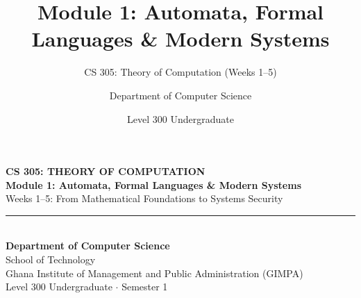 \documentclass[aspectratio=169, 10pt]{beamer}
\title{Module 1: Automata, Formal Languages \& Modern Systems}
\subtitle{CS 305: Theory of Computation (Weeks 1--5)}
\author{Department of Computer Science}
\institute{Ghana Institute of Management and Public Administration (GIMPA)}
\date{Level 300 Undergraduate}
\begin{document}
\begin{frame}[plain]
  \vspace{1.0cm}
  \begin{center}
    {\large\bfseries\color{gimpaaccent} CS 305: THEORY OF COMPUTATION}\\[0.25cm]
    {\Large\bfseries\color{gimpanavy} Module 1: Automata, Formal Languages \& Modern Systems}\\[0.15cm]
    {\normalsize\color{gimpaslate} Weeks 1--5: From Mathematical Foundations to Systems Security}\\[0.6cm]
    
    {\color{ruleGray}\rule{0.50\textwidth}{0.8pt}}\\[0.65cm]
    
    {\normalsize\bfseries\color{charcoalText} Department of Computer Science}\\[0.12cm]
    {\footnotesize\color{gimpaslate} School of Technology}\\[0.12cm]
    {\footnotesize\color{gimpaslate} Ghana Institute of Management and Public Administration (GIMPA)}\\[0.45cm]
    {\footnotesize\color{gimpaslate} Level 300 Undergraduate $\cdot$ Semester 1}
  \end{center}
\end{frame}
\end{document}

